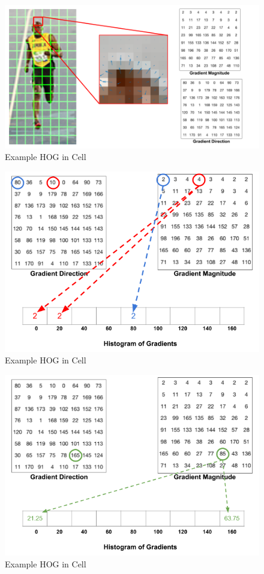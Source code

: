 \documentclass{article}
\begin{document}
\begin{figure}[H]
\centering
\includegraphics[width = 0.9\linewidth]{Images/hog-cell-gradients.png}
\caption{Example HOG in Cell}
\end{figure}

\begin{figure}[H]
\centering
\includegraphics[width = 0.8\linewidth]{Images/hog-histogram-1.png}
\caption{Example HOG in Cell}
\end{figure}

\begin{figure}[H]
\centering
\includegraphics[width = 0.8\linewidth]{Images/hog-histogram-2.png}
\caption{Example HOG in Cell}
\end{figure}
\end{document}
